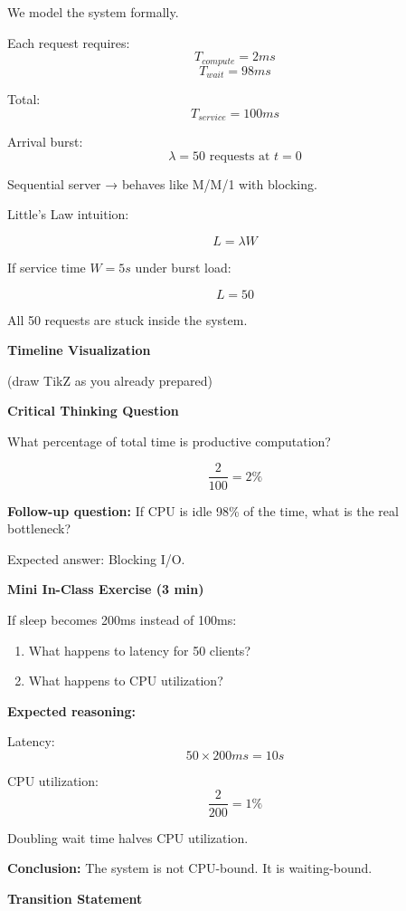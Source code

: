 \documentclass[11pt,a4paper]{article}
\begin{document}
We model the system formally.

Each request requires:
\[
T_{compute} = 2ms
\]
\[
T_{wait} = 98ms
\]

Total:
\[
T_{service} = 100ms
\]

Arrival burst:
\[
\lambda = 50 \text{ requests at } t=0
\]

Sequential server → behaves like M/M/1 with blocking.

Little's Law intuition:

\[
L = \lambda W
\]

If service time $W = 5s$ under burst load:

\[
L = 50
\]

All 50 requests are stuck inside the system.

\textbf{Timeline Visualization}

(draw TikZ as you already prepared)

\textbf{Critical Thinking Question}

What percentage of total time is productive computation?

\[
\frac{2}{100} = 2\%
\]

\textbf{Follow-up question:}
If CPU is idle 98\% of the time,
what is the real bottleneck?

Expected answer:
Blocking I/O.

\textbf{Mini In-Class Exercise (3 min)}

If sleep becomes 200ms instead of 100ms:

\begin{enumerate}
	\item What happens to latency for 50 clients?
	\item What happens to CPU utilization?
\end{enumerate}

\textbf{Expected reasoning:}

Latency:
\[
50 \times 200ms = 10s
\]

CPU utilization:
\[
\frac{2}{200} = 1\%
\]

Doubling wait time halves CPU utilization.

\textbf{Conclusion:}
The system is not CPU-bound.
It is waiting-bound.

\textbf{Transition Statement}
\end{document}
